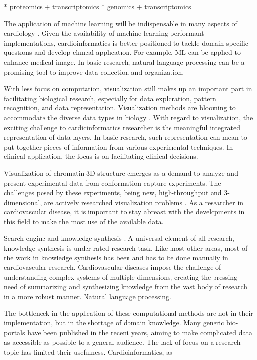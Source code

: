 \documentclass[letter]{bioinfo}
\begin{document}
* proteomics + transcriptomics \citep{Uhlen:2015:Tissuebased}
* genomics + transcriptomics \citep{Klarin:2017:Genetic}



The application of machine learning will be indispensable in many aspects of cardiology \citep{Shameer:2017:Translational,Shameer:2018:Machine}. Given the availability of machine learning performant implementations, cardioinformatics is better positioned to tackle domain-specific questions and develop clinical application. For example, ML can be applied to enhance medical image. In basic research, natural language processing can be a promising tool to improve data collection and organization.

With less focus on computation, visualization still makes up an important part in facilitating biological research, especially for data exploration, pattern recognition, and data representation. Visualization methods are blooming to accommodate the diverse data types in biology \citep{Pavlopoulos:2015:Visualizing}. With regard to visualization, the exciting challenge to cardioinformatics researcher is the meaningful integrated representation of data layers. In basic research, such representation can mean to put together pieces of information from various experimental techniques. In clinical application, the focus is on facilitating clinical decisions.

Visualization of chromatin 3D structure emerges as a demand to analyze and present experimental data from conformation capture experiments. The challenges posed by these experiments, being new, high-throughput and  3-dimensional, are actively researched visualization problems \citep{Goodstadt:2017:Challenges}. As a researcher in cardiovascular disease, it is important to stay abreast with the developments in this field to make the most use of the available data.

Search engine and knowledge synthesis \citep{Lutjohann:2011:Sciencenet}. A universal element of all research, knowledge synthesis is under-rated research task. Like most other areas, most of the work in knowledge synthesis has been and has to be done manually in cardiovascular research. Cardiovascular diseases impose the challenge of understanding complex systems of multiple dimensions, creating the pressing need of summarizing and synthesizing knowledge from the vast body of research in a more robust manner. Natural language processing.


The bottleneck in the application of these computational methods are not in their implementation, but in the shortage of domain knowledge. Many generic bio-portals have been published in the recent years, aiming to make complicated data as accessible as possible to a general audience. The lack of focus on a research topic has limited their usefulness. Cardioinformatics, as 
\end{document}
